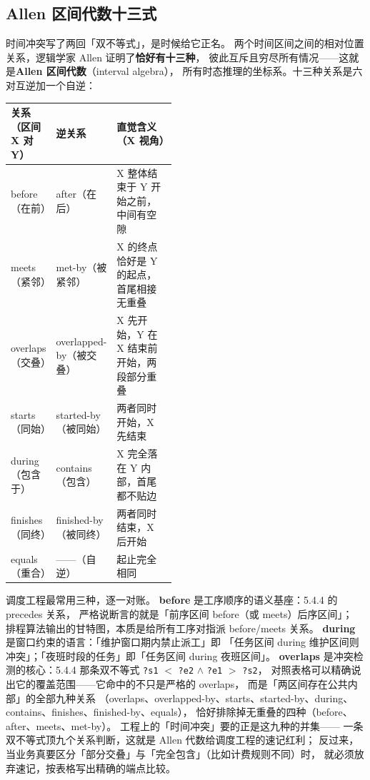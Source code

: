 \subsection{Allen 区间代数十三式}

时间冲突写了两回「双不等式」，是时候给它正名。
两个时间区间之间的相对位置关系，逻辑学家 Allen 证明了\textbf{恰好有十三种}，
彼此互斥且穷尽所有情况——这就是\textbf{Allen 区间代数}（interval algebra），
所有时态推理的坐标系。十三种关系是六对互逆加一个自逆：

\begin{center}
\begin{tabularx}{\linewidth}{@{}p{0.26\linewidth}p{0.20\linewidth}X@{}}
\toprule
\textbf{关系（区间 X 对 Y）} & \textbf{逆关系} & \textbf{直觉含义（X 视角）} \\
\midrule
before（在前） & after（在后） & X 整体结束于 Y 开始之前，中间有空隙 \\
meets（紧邻） & met-by（被紧邻） & X 的终点恰好是 Y 的起点，首尾相接无重叠 \\
overlaps（交叠） & overlapped-by（被交叠） & X 先开始，Y 在 X 结束前开始，两段部分重叠 \\
starts（同始） & started-by（被同始） & 两者同时开始，X 先结束 \\
during（包含于） & contains（包含） & X 完全落在 Y 内部，首尾都不贴边 \\
finishes（同终） & finished-by（被同终） & 两者同时结束，X 后开始 \\
equals（重合） & ——（自逆） & 起止完全相同 \\
\bottomrule
\end{tabularx}
\end{center}

调度工程最常用三种，逐一对账。
\textbf{before} 是工序顺序的语义基座：5.4.4 的 precedes 关系，
严格说断言的就是「前序区间 before（或 meets）后序区间」；
排程算法输出的甘特图，本质是给所有工序对指派 before/meets 关系。
\textbf{during} 是窗口约束的语言：「维护窗口期内禁止派工」即
「任务区间 during 维护区间则冲突」；「夜班时段的任务」即「任务区间 during 夜班区间」。
\textbf{overlaps} 是冲突检测的核心：5.4.4 那条双不等式
\texttt{?s1} \(<\) \texttt{?e2} \(\land\) \texttt{?e1} \(>\) \texttt{?s2}，
对照表格可以精确说出它的覆盖范围——它命中的不只是严格的 overlaps，
而是「两区间存在公共内部」的全部九种关系
（overlaps、overlapped-by、starts、started-by、during、contains、finishes、finished-by、equals），
恰好排除掉无重叠的四种（before、after、meets、met-by）。
工程上的「时间冲突」要的正是这九种的并集——
一条双不等式顶九个关系判断，这就是 Allen 代数给调度工程的速记红利；
反过来，当业务真要区分「部分交叠」与「完全包含」（比如计费规则不同）时，
就必须放弃速记，按表格写出精确的端点比较。

